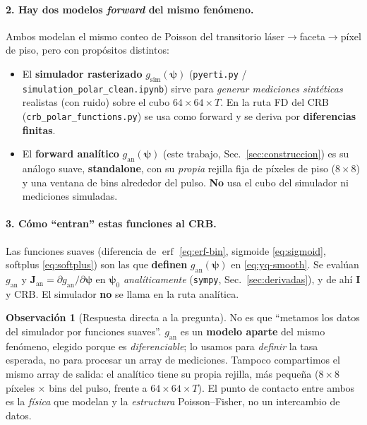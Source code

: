 \documentclass[11pt,a4paper]{article}
\theoremstyle{plain}
\theoremstyle{definition}
\newtheorem{remark}{Observaci\'on}
\newcommand{\vect}[1]{\boldsymbol{#1}}
\newcommand{\matr}[1]{\mathbf{#1}}
\newcommand{\erf}{\operatorname{erf}}
\begin{document}
\paragraph{2. Hay dos modelos \emph{forward} del mismo fen\'omeno.} Ambos modelan
el mismo conteo de Poisson del transitorio l\'aser$\to$faceta$\to$p\'ixel de piso,
pero con prop\'ositos distintos:
\begin{itemize}[nosep]
    \item El \textbf{simulador rasterizado} $g_{\mathrm{sim}}(\vect{\psi})$
    (\texttt{pyerti.py} / \texttt{simulation\_polar\_clean.ipynb}) sirve para
    \emph{generar mediciones sint\'eticas} realistas (con ruido) sobre el cubo
    $64\times64\times T$. En la ruta FD del CRB (\texttt{crb\_polar\_functions.py})
    se usa como forward y se deriva por \textbf{diferencias finitas}.
    \item El \textbf{forward anal\'itico} $g_{\mathrm{an}}(\vect{\psi})$
    (este trabajo, Sec.~\ref{sec:construccion}) es su an\'alogo suave,
    \textbf{standalone}, con su \emph{propia} rejilla fija de p\'ixeles de piso
    ($8\times8$) y una ventana de bins alrededor del pulso. \textbf{No} usa el
    cubo del simulador ni mediciones simuladas.
\end{itemize}

\paragraph{3. C\'omo ``entran'' estas funciones al CRB.} Las funciones suaves
(diferencia de $\erf$ \eqref{eq:erf-bin}, sigmoide \eqref{eq:sigmoid}, softplus
\eqref{eq:softplus}) son las que \textbf{definen} $g_{\mathrm{an}}(\vect{\psi})$
en \eqref{eq:yq-smooth}. Se eval\'uan $g_{\mathrm{an}}$ y
$\matr J_{\mathrm{an}}=\partial g_{\mathrm{an}}/\partial\vect{\psi}$ en
$\vect{\psi}_0$ \emph{anal\'iticamente} (\texttt{sympy}, Sec.~\ref{sec:derivadas}),
y de ah\'i $\matr I$ y $\mathrm{CRB}$. El simulador \textbf{no} se llama en la ruta
anal\'itica.

\begin{remark}[Respuesta directa a la pregunta]
No es que ``metamos los datos del simulador por funciones suaves''.
$g_{\mathrm{an}}$ es un \textbf{modelo aparte} del mismo fen\'omeno, elegido
porque es \emph{diferenciable}; lo usamos para \emph{definir} la tasa esperada,
no para procesar un array de mediciones. Tampoco compartimos el mismo array de
salida: el anal\'itico tiene su propia rejilla, m\'as peque\~na ($8\times8$
p\'ixeles $\times$ bins del pulso, frente a $64\times64\times T$). El punto de
contacto entre ambos es la \emph{f\'isica} que modelan y la \emph{estructura}
Poisson--Fisher, no un intercambio de datos.
\end{remark}
\end{document}

